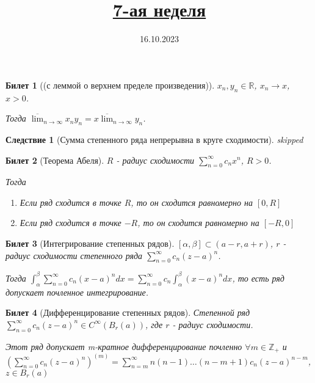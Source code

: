 \documentclass[11pt,a4paper,oneside]{scrartcl}
\title{\href{https://www.youtube.com/live/pxLv7b4ne-4?si=FdHOL9RRxvanex11}{7-ая неделя}}
\date{16.10.2023}
\newcommand{\Z}{\mathbb{Z}}
\newtheorem{consequence}{Следствие}
\newtheorem{ticket}{Билет}
\begin{document}
\pagestyle{empty}

\maketitle


\setcounter{ticket}{34}
\addtocounter{ticket}{-1}
\begin{ticket}[(с леммой о верхнем пределе произведения)]
    $x_n, y_n \in \mathbb{R}$, $x_n \rightarrow x$, $x > 0$.

    Тогда $\overline{\lim}_{n \rightarrow \infty} x_n y_n
    = x \overline{\lim}_{n \rightarrow \infty} y_n$.
\end{ticket}

\begin{consequence}[Сумма степенного ряда непрерывна в круге сходимости]
    skipped
\end{consequence}

\begin{ticket}[Теорема Абеля]
    $R$ - радиус сходимости $\sum_{n=0}^\infty c_n x^n$, $R > 0$.

    Тогда
    \begin{enumerate}
        \item Если ряд сходится в точке $R$, то он сходится равномерно на $[0, R]$
        \item Если ряд сходится в точке $-R$, то он сходится равномерно на $[-R, 0]$
    \end{enumerate}
\end{ticket}

\addtocounter{ticket}{-1}
\begin{ticket}[Интегрирование степенных рядов]
    $[\alpha, \beta] \subset (a-r, a+r)$, $r$ - радиус сходимости
    степенного ряда $\sum_{n=0}^\infty c_n (z-a)^n$.

    Тогда $\int_\alpha^\beta \sum_{n=0}^\infty c_n (x-a)^n dx
    = \sum_{n=0}^\infty c_n \int_\alpha^\beta (x-a)^n dx$,
    то есть ряд допускает почленное интегрирование.
\end{ticket}

\addtocounter{ticket}{-1}
\begin{ticket}[Дифференцирование степенных рядов]
    Степенной ряд $\sum_{n=0}^\infty c_n (z-a)^n \in C^\infty (B_r (a))$,
    где $r$ - радиус сходимости.

    Этот ряд допускает m-кратное дифференцирование почленно $\forall m \in \Z_+$
    и $(\sum_{n=0}^\infty c_n (z-a)^n)^{(m)}
    = \sum_{n=m}^\infty n (n-1) \dots(n-m+1) c_n (z-a)^{n-m}$, $z \in B_r(a)$
\end{ticket}
\end{document}

